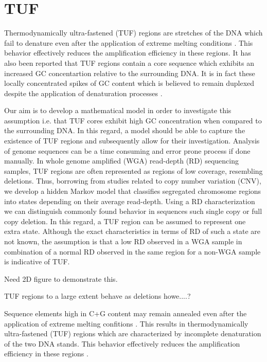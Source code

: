 
\section{TUF}
\label{tuf}

Thermodynamically ultra-fastened (TUF) regions are stretches of the DNA which fail to denature
even after the application of extreme melting conditions \cite{veal2012}. 
This behavior effectively reduces the amplification efficiency in these regions. It has also been reported that 
TUF regions contain a core sequence which exhibits an increased GC concentartion relative to the
surrounding DNA. It is in fact these locally concentrated spikes of GC content which is believed
to remain duplexed despite the application of denaturation processes \cite{veal2012}. 

Our aim is to develop a mathematical model in order to investigate this assumption i.e. that
TUF cores exhibit high GC concentration when compared to the surrounding DNA. In this regard, a model
should be able to capture the existence of TUF regions and subsequently allow for their investigation. 
Analysis of genome sequences can be a time consuming and error prone process if done manually.
In whole genome amplified (WGA) read-depth (RD) sequencing samples, TUF regions are often represented as regions of low coverage, resembling deletions. 
Thus,  borrowing from studies related to copy number variation (CNV),  we develop a hidden Markov model that classifies segregated chromosome regions into states depending on their average read-depth. Using a RD characterization we can distinguish commonly found behavior in sequences such single copy or full copy deletion.
In this regard, a TUF region can be assumed to represent one extra state. Although the exact characteristics in terms of RD of such a state are not known, the assumption is that a low RD observed in a WGA sample in combination of a normal RD observed in the same region for a non-WGA sample is indicative of TUF. 


Need 2D figure to demonstrate this.

TUF regions to a large extent behave as deletions howe....?

Sequence elements high in C+G content may remain annealed even after the application of extreme
melting confitions \cite{veal2012}. This results in thermodynamically ultra-fastened (TUF) regions which are characterized by incomplete denaturation of the two DNA stands. This behavior effectively reduces the amplification efficiency in these regions \cite{veal2012}. 

